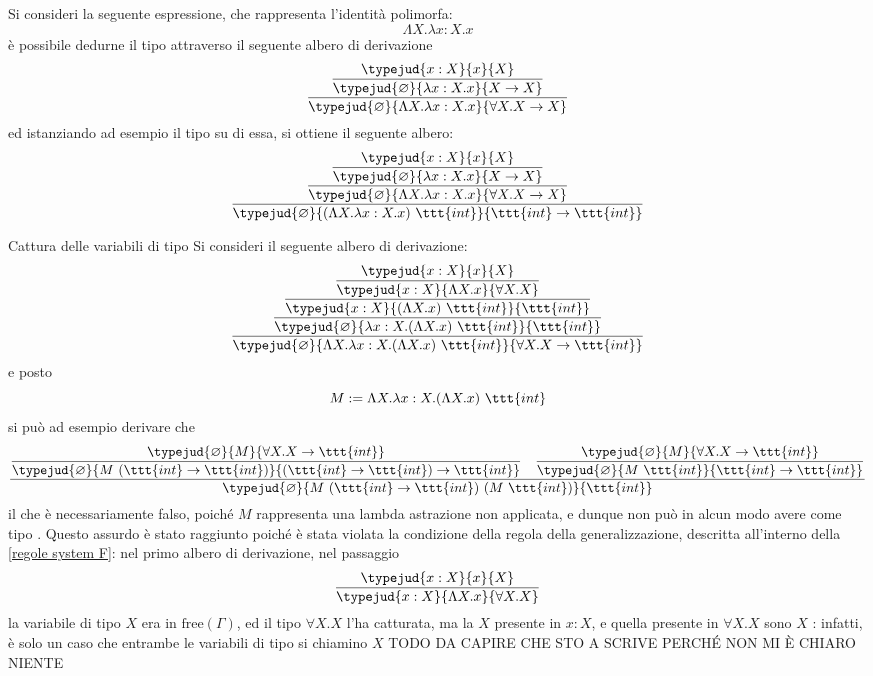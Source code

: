 \documentclass[a4paper, 12pt]{report}
\begin{document}
    \begin{example}
        Si consideri la seguente espressione, che rappresenta l'identità polimorfa: $$\Lambda X.\lambda x:X.x$$ è possibile dedurne il tipo attraverso il seguente albero di derivazione $$\dfrac{\dfrac{\typejud{x :X}{x}{X}}{\typejud{\varnothing}{\lambda x:X.x}{X \to X}}}{\typejud{\varnothing}{\Lambda X.\lambda x:X .x}{\forall X.X \to X}}$$ ed istanziando ad esempio il tipo  su di essa, si ottiene il seguente albero: $$\dfrac{\dfrac{\dfrac{\typejud{x :X}{x}{X}}{\typejud{\varnothing}{\lambda x:X.x}{X \to X}}}{\typejud{\varnothing}{\Lambda X.\lambda x:X .x}{\forall X.X \to X}}}{\typejud{\varnothing}{(\Lambda X.\lambda x :X.x) \ \ttt{int}}{\ttt{int} \to \ttt{int}}}$$
    \end{example}

    \begin{framedobs}{Cattura delle variabili di tipo}
        Si consideri il seguente albero di derivazione: $$\dfrac{\dfrac{\dfrac{\dfrac{\typejud{x:X}{x}{X}}{\typejud{x:X}{\Lambda X.x}{\forall X.X}}}{\typejud{x:X}{(\Lambda X.x) \ \ttt{int}}{\ttt{int}}}}{\typejud{\varnothing}{\lambda x:X.(\Lambda X.x) \ \ttt{int}}{\ttt{int}}}}{\typejud{\varnothing}{\Lambda X.\lambda x:X.(\Lambda X.x) \ \ttt{int}}{\forall X.X \to \ttt{int}}}$$ e posto $$M := \Lambda X.\lambda x:X.(\Lambda X.x) \ \ttt{int}$$ si può ad esempio derivare che $$\dfrac{\dfrac{\typejud{\varnothing}{M}{\forall X.X \to \ttt{int}}}{\typejud{\varnothing}{M \ (\ttt{int} \to \ttt{int})}{(\ttt{int} \to \ttt{int}) \to \ttt{int}}} \quad \dfrac{\typejud{\varnothing}{M}{\forall X.X \to \ttt{int}}}{\typejud{\varnothing}{M \ \ttt{int}}{\ttt{int} \to \ttt{int}}}}{\typejud{\varnothing}{M \ (\ttt{int} \to \ttt{int}) \ (M \ \ttt{int})}{\ttt{int}}}$$ il che è necessariamente falso, poiché $M$ rappresenta una lambda astrazione non applicata, e dunque non può in alcun modo avere come tipo . Questo assurdo è stato raggiunto poiché è stata violata la condizione della regola della generalizzazione, descritta all'interno della \cref{regole system F}: nel primo albero di derivazione, nel passaggio $$\dfrac{\typejud{x:X}{x}{X}}{\typejud{x:X}{\Lambda X.x}{\forall X.X}}$$ la variabile di tipo $X$ era in $\mathrm{free}(\Gamma)$, ed il tipo $\forall X.X$ l'ha catturata, ma la $X$ presente in $x:X$, e quella presente in $\forall X.X$ sono $X$ : infatti, è solo un caso che entrambe le variabili di tipo si chiamino $X$ TODO DA CAPIRE CHE STO A SCRIVE PERCHÉ NON MI È CHIARO NIENTE
    \end{framedobs}
\end{document}
